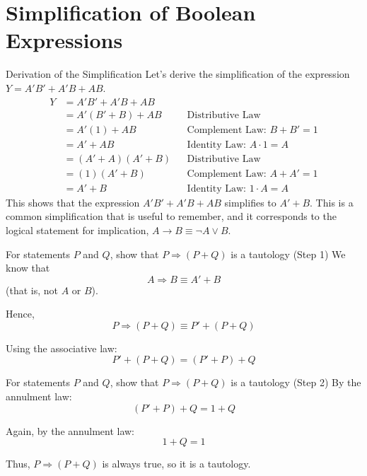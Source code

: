 \documentclass{beamer}
\begin{document}
\section{Simplification of Boolean Expressions}
\begin{frame}{Derivation of the Simplification}
    Let's derive the simplification of the expression $Y = A'B' + A'B + AB$.
    \begin{align*}
        Y &= A'B' + A'B + AB \\
          &= A'(B' + B) + AB && \text{Distributive Law} \\
          &= A'(1) + AB && \text{Complement Law: $B + B' = 1$} \\
          &= A' + AB && \text{Identity Law: $A \cdot 1 = A$} \\
          &= (A' + A)(A' + B) && \text{Distributive Law} \\
          &= (1)(A' + B) && \text{Complement Law: $A + A' = 1$} \\
          &= A' + B && \text{Identity Law: $1 \cdot A = A$}
    \end{align*}
    This shows that the expression $A'B' + A'B + AB$ simplifies to $A' + B$. This is a common simplification that is useful to remember, and it corresponds to the logical statement for implication, $A \rightarrow B \equiv \neg A \lor B$.
\end{frame}

\begin{frame}{For statements $P$ and $Q$, show that $P \Rightarrow (P + Q)$ is a tautology (Step 1)}
We know that 
\[
A \Rightarrow B \equiv A' + B
\] 
(that is, not $A$ or $B$).  

Hence,
\[
P \Rightarrow (P + Q) \equiv P' + (P + Q)
\]

Using the associative law:
\[
P' + (P + Q) = (P' + P) + Q
\]
\end{frame}

\begin{frame}{For statements $P$ and $Q$, show that $P \Rightarrow (P + Q)$ is a tautology (Step 2)}
By the annulment law:
\[
(P' + P) + Q = 1 + Q
\]

Again, by the annulment law:
\[
1 + Q = 1
\]

\alert{Thus, $P \Rightarrow (P + Q)$ is always true, so it is a tautology.}
\end{frame}
\end{document}
